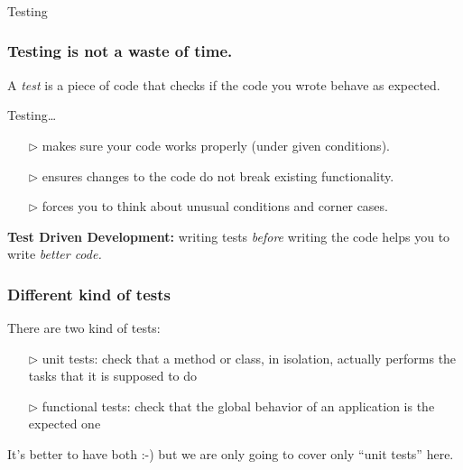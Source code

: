 \begin{frame}[fragile]\frametitle{}
\begin{center}
{\Large Testing}
\end{center}
\end{frame}

\begin{frame}[fragile]\frametitle{Testing is \textbf{not} a waste of time.}
  A \emph{test} is a piece of code that checks if the code you
  wrote behave as expected.


  Testing\ldots
  \begin{itemize}
  \item[$\triangleright$] makes sure your code works properly (under given conditions).
  \item[$\triangleright$] ensures changes to the code do not break existing functionality.
  \item[$\triangleright$] forces you to think about unusual conditions and corner cases.
  \end{itemize}

\textbf{Test Driven Development:} writing tests \textit{before}
  writing the code helps you to write \emph{better code.}
\end{frame}

\begin{frame}[fragile]\frametitle{Different kind of tests}

  There are two kind of tests:

  \begin{itemize}
  \item[$\triangleright$] unit tests:    check that a method or class, in isolation,
    actually performs the tasks that it is supposed to do
  \item[$\triangleright$] 
    functional tests:
    check that the global behavior of an application is the expected one

  \end{itemize}

  It's better to have both :-) but we are only going to cover
  only ``unit tests'' here.
\end{frame}

